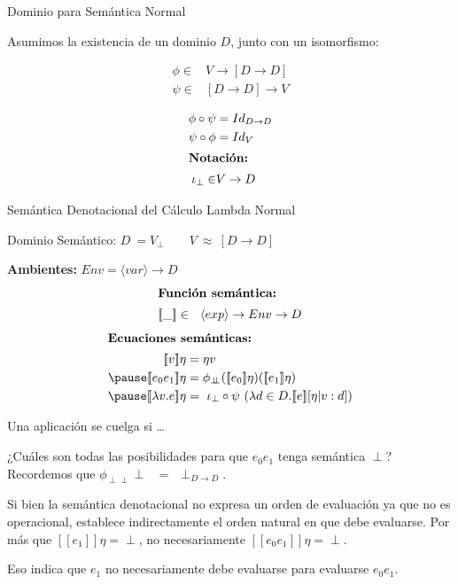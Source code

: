 \documentclass[handout]{beamer}
\newcommand{\se}[1]{\mbox{$[\![#1]\!]$}}
\begin{document}
\begin{frame}{Dominio para Semántica Normal}

Asumimos la existencia de un dominio $D$, junto con un isomorfismo:

\bigskip

\begin{align*}
\phi\in & V\rightarrow [D\rightarrow D]\\
\psi\in &[D\rightarrow D] \rightarrow V
\end{align*}

\begin{align*}
\phi \circ \psi &= Id_{D\rightarrow D}\\
  \psi\circ\phi &= Id_{V}\\
  \shortintertext{\textbf{Notación: }} 
  \iota_\perp\in & V\rightarrow D
\end{align*}
\bigskip

\end{frame}


\begin{frame}{Semántica Denotacional del Cálculo Lambda Normal}

Dominio Semántico: $D \ = V_\perp \qquad  V\ \approx\ [D\rightarrow D]$
\pause

\bigskip

\textbf{Ambientes:} $Env = \langle var\rangle\rightarrow D$
\pause
\bigskip
\begin{align*}
  \shortintertext{\textbf{Función semántica:}}
  \se{\_}\in\ \ \langle exp\rangle \rightarrow Env\rightarrow D
\end{align*}
\pause
\vspace{-4ex}
\begin{align*}
\shortintertext{\textbf{Ecuaciones semánticas:}}
  \se{v}\eta &= \eta v\\
  \pause
  \se{e_0 e_1}\eta &= \phi_{\perp\!\!\!\perp}(\se{e_0}\eta) (\se{e_1}\eta)\\
  \pause
  \se{\lambda v.e}\eta &=\  \iota_\perp\circ\psi\ (\lambda d\in D. \se{e}[\eta|v:d])
\end{align*}
\end{frame}


\begin{frame}{Una aplicación se cuelga si \ldots}

¿Cuáles son todas las posibilidades para que $e_0e_1$ tenga semántica $\perp$? \pause
\bigskip
Recordemos que $\phi_{\perp\!\!\!\perp} \perp\  \ \ =\  \ \perp_{D\rightarrow D}$. \pause

\bigskip

Si bien la semántica denotacional no expresa un orden de evaluación ya
que no es operacional, establece indirectamente el orden natural en
que debe evaluarse. \pause
\bigskip
Por más que $\se{e_1}\eta = \perp$, no necesariamente
$\se{e_0e_1}\eta = \perp$.
\pause

\medskip Eso indica que $e_1$ no necesariamente debe evaluarse para
evaluarse $e_0 e_1$.

\end{frame}
\end{document}
